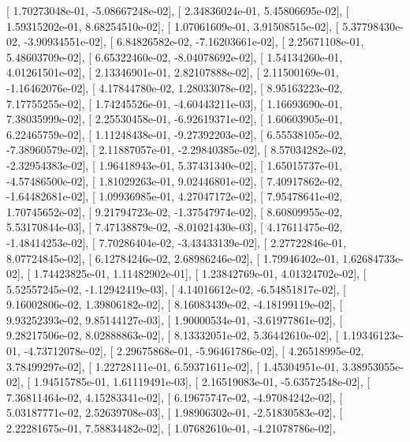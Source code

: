 \documentclass{article}
\begin{document}
       [  1.70273048e-01,  -5.08667248e-02],
       [  2.34836024e-01,   5.45806695e-02],
       [  1.59315202e-01,   8.68254510e-02],
       [  1.07061609e-01,   3.91508515e-02],
       [  5.37798430e-02,  -3.90934551e-02],
       [  6.84826582e-02,  -7.16203661e-02],
       [  2.25671108e-01,   5.48603709e-02],
       [  6.65322460e-02,  -8.04078692e-02],
       [  1.54134260e-01,   4.01261501e-02],
       [  2.13346901e-01,   2.82107888e-02],
       [  2.11500169e-01,  -1.16462076e-02],
       [  4.17844780e-02,   1.28033078e-02],
       [  8.95163223e-02,   7.17755255e-02],
       [  1.74245526e-01,  -4.60443211e-03],
       [  1.16693690e-01,   7.38035999e-02],
       [  2.25530458e-01,  -6.92619371e-02],
       [  1.60603905e-01,   6.22465759e-02],
       [  1.11248438e-01,  -9.27392203e-02],
       [  6.55538105e-02,  -7.38960579e-02],
       [  2.11887057e-01,  -2.29840385e-02],
       [  8.57034282e-02,  -2.32954383e-02],
       [  1.96418943e-01,   5.37431340e-02],
       [  1.65015737e-01,  -4.57486500e-02],
       [  1.81029263e-01,   9.02446801e-02],
       [  7.40917862e-02,  -1.64482681e-02],
       [  1.09936985e-01,   4.27047172e-02],
       [  7.95478641e-02,   1.70745652e-02],
       [  9.21794723e-02,  -1.37547974e-02],
       [  8.60809955e-02,   5.53170844e-03],
       [  7.47138879e-02,  -8.01021430e-03],
       [  4.17611475e-02,  -1.48414253e-02],
       [  7.70286404e-02,  -3.43433139e-02],
       [  2.27722846e-01,   8.07724845e-02],
       [  6.12784246e-02,   2.68986246e-02],
       [  1.79946402e-01,   1.62684733e-02],
       [  1.74423825e-01,   1.11482902e-01],
       [  1.23842769e-01,   4.01324702e-02],
       [  5.52557245e-02,  -1.12942419e-03],
       [  4.14016612e-02,  -6.54851817e-02],
       [  9.16002806e-02,   1.39806182e-02],
       [  8.16083439e-02,  -4.18199119e-02],
       [  9.93252393e-02,   9.85144127e-03],
       [  1.90000534e-01,  -3.61977861e-02],
       [  9.28217506e-02,   8.02888863e-02],
       [  8.13332051e-02,   5.36442610e-02],
       [  1.19346123e-01,  -4.73712078e-02],
       [  2.29675868e-01,  -5.96461786e-02],
       [  4.26518995e-02,   3.78499297e-02],
       [  1.22728111e-01,   6.59371611e-02],
       [  1.45304951e-01,   3.38953055e-02],
       [  1.94515785e-01,   1.61119491e-03],
       [  2.16519083e-01,  -5.63572548e-02],
       [  7.36811464e-02,   4.15283341e-02],
       [  6.19675747e-02,  -4.97084242e-02],
       [  5.03187771e-02,   2.52639708e-03],
       [  1.98906302e-01,  -2.51830583e-02],
       [  2.22281675e-01,   7.58834482e-02],
       [  1.07682610e-01,  -4.21078786e-02],
\end{document}
